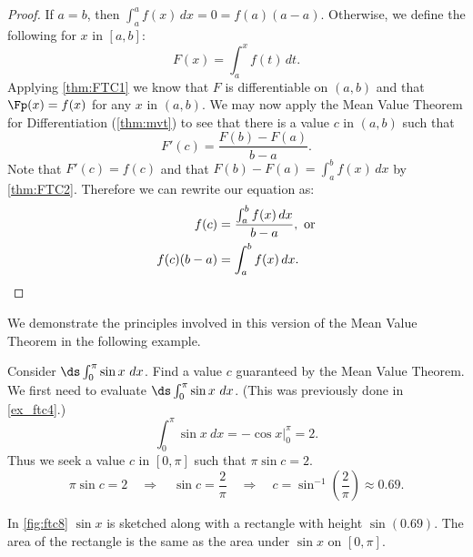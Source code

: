 \begin{proof}
If $a=b$, then $\int_a^a f(x)\,dx =0=f(a)(a-a)$. Otherwise, we define the following for $x$ in $[a,b]$:
\[ F(x)=\int_a^x f(t)\,dt.\]
Applying \autoref{thm:FTC1} we know that $F$ is differentiable on $(a,b)$ and that $\Fp(x)=f(x)$ for any $x$ in $(a,b)$. We may now apply the Mean Value Theorem for Differentiation (\autoref{thm:mvt}) to see that there is a value $c$ in $(a,b)$ such that
\[F'(c)=\frac{F(b)-F(a)}{b-a}.\]
Note that $F'(c)=f(c)$ and that $F(b)-F(a)=\int_a^b f(x)\,dx$ by \autoref{thm:FTC2}. Therefore we can rewrite our equation as: 
\begin{align*}
f(c)&=\frac{\int_a^b f(x)\,dx}{b-a},\text{ or}\\
f(c)(b-a)&=\int_a^b f(x)\,dx.\qedhere
\end{align*}
\end{proof}

We demonstrate the principles involved in this version of the Mean Value Theorem in the following example.


\begin{example}\label{ex_ftc8}
Consider $\ds\int_0^\pi \sin x\ dx$. Find a value $c$ guaranteed by the Mean Value Theorem.
\solution
We first need to evaluate $\ds\int_0^\pi \sin x\ dx$. (This was previously done in \autoref{ex_ftc4}.)
\[\int_0^\pi\sin x\ dx = -\cos x \Big|_0^\pi = 2.\]
Thus we seek a value $c$ in $[0,\pi]$ such that $\pi\sin c =2$. 
\[
 \pi\sin c = 2\quad \Rightarrow\quad
 \sin c =\frac2\pi\quad \Rightarrow\quad
 c = \sin^{-1}\left(\frac2\pi\right) \approx 0.69.
\]

In \autoref{fig:ftc8} $\sin x$ is sketched along with a rectangle with height $\sin (0.69)$. The area of the rectangle is the same as the area under $\sin x$ on $[0,\pi]$.
\end{example}

